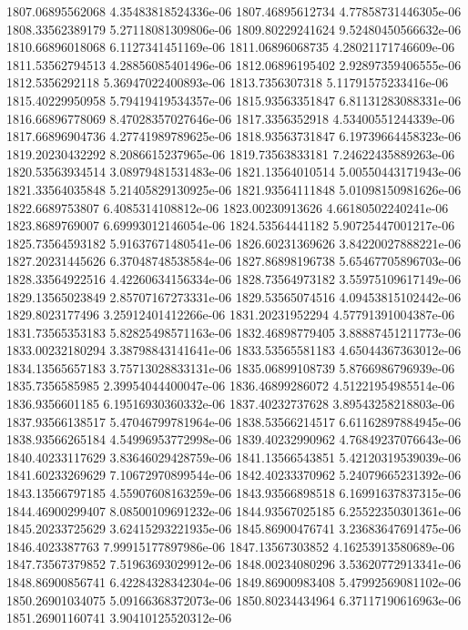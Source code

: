 {1807.06895562068 4.35483818524336e-06
1807.46895612734 4.77858731446305e-06
1808.33562389179 5.27118081309806e-06
1809.80229241624 9.52480450566632e-06
1810.66896018068 6.1127341451169e-06
1811.06896068735 4.28021171746609e-06
1811.53562794513 4.28856085401496e-06
1812.06896195402 2.92897359406555e-06
1812.5356292118 5.36947022400893e-06
1813.7356307318 5.11791575233416e-06
1815.40229950958 5.79419419534357e-06
1815.93563351847 6.81131283088331e-06
1816.66896778069 8.47028357027646e-06
1817.3356352918 4.53400551244339e-06
1817.66896904736 4.27741989789625e-06
1818.93563731847 6.19739664458323e-06
1819.20230432292 8.2086615237965e-06
1819.73563833181 7.24622435889263e-06
1820.53563934514 3.08979481531483e-06
1821.13564010514 5.00550443171943e-06
1821.33564035848 5.21405829130925e-06
1821.93564111848 5.01098150981626e-06
1822.6689753807 6.4085314108812e-06
1823.00230913626 4.66180502240241e-06
1823.8689769007 6.69993012146054e-06
1824.53564441182 5.90725447001217e-06
1825.73564593182 5.91637671480541e-06
1826.60231369626 3.84220027888221e-06
1827.20231445626 6.37048748538584e-06
1827.86898196738 5.65467705896703e-06
1828.33564922516 4.42260634156334e-06
1828.73564973182 3.55975109617149e-06
1829.13565023849 2.85707167273331e-06
1829.53565074516 4.09453815102442e-06
1829.8023177496 3.25912401412266e-06
1831.20231952294 4.57791391004387e-06
1831.73565353183 5.82825498571163e-06
1832.46898779405 3.88887451211773e-06
1833.00232180294 3.38798843141641e-06
1833.53565581183 4.65044367363012e-06
1834.13565657183 3.75713028833131e-06
1835.06899108739 5.8766986796939e-06
1835.7356585985 2.39954044400047e-06
1836.46899286072 4.51221954985514e-06
1836.9356601185 6.19516930360332e-06
1837.40232737628 3.89543258218803e-06
1837.93566138517 5.47046799781964e-06
1838.53566214517 6.61162897884945e-06
1838.93566265184 4.54996953772998e-06
1839.40232990962 4.76849237076643e-06
1840.40233117629 3.83646029428759e-06
1841.13566543851 5.42120319539039e-06
1841.60233269629 7.10672970899544e-06
1842.40233370962 5.24079665231392e-06
1843.13566797185 4.55907608163259e-06
1843.93566898518 6.16991637837315e-06
1844.46900299407 8.08500109691232e-06
1844.93567025185 6.25522350301361e-06
1845.20233725629 3.62415293221935e-06
1845.86900476741 3.23683647691475e-06
1846.4023387763 7.99915177897986e-06
1847.13567303852 4.16253913580689e-06
1847.73567379852 7.51963693029912e-06
1848.00234080296 3.53620772913341e-06
1848.86900856741 6.42284328342304e-06
1849.86900983408 5.47992569081102e-06
1850.26901034075 5.09166368372073e-06
1850.80234434964 6.37117190616963e-06
1851.26901160741 3.90410125520312e-06
}

